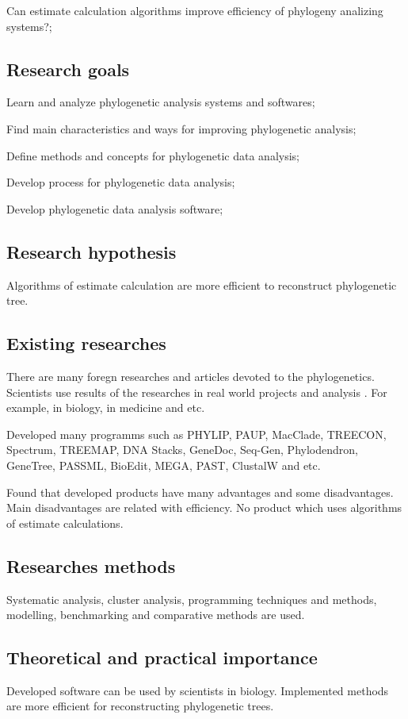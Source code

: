 Can estimate calculation algorithms improve efficiency of phylogeny 
analizing systems?;

\subsection*{Research goals} 

Learn and analyze phylogenetic analysis systems and softwares;

Find main characteristics and ways for improving phylogenetic analysis;

Define methods and concepts for phylogenetic data analysis;

Develop process for phylogenetic data analysis;	

Develop phylogenetic data analysis software; 

\subsection*{Research hypothesis}
Algorithms of estimate calculation are more efficient to 
reconstruct phylogenetic tree.

\subsection*{Existing researches}
There are many foregn researches and articles 
devoted to the phylogenetics.
Scientists use results of the researches in real 
world projects and analysis . For example, in biology, 
in medicine and etc.

Developed many programms such as PHYLIP, PAUP, MacClade, 
TREECON, Spectrum, TREEMAP, DNA Stacks, GeneDoc, Seq-Gen, 
Phylodendron, GeneTree, PASSML, BioEdit, MEGA, PAST, ClustalW and etc.

Found that developed products have many advantages and some 
disadvantages. Main disadvantages are related with efficiency. 
No product which uses algorithms of estimate calculations.

\subsection*{Researches methods}
Systematic analysis, cluster analysis, programming techniques and 
methods, modelling, benchmarking and comparative methods are used.

\subsection*{Theoretical and practical importance}
Developed software can be used by scientists in biology.
Implemented methods are more efficient for reconstructing
phylogenetic trees.

